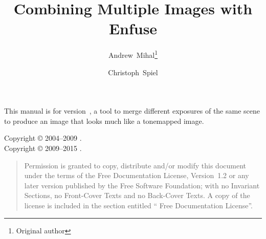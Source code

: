 

\begin{titlepage}
  \renewcommand{\thefootnote}{\fnsymbol{footnote}}

  \author{Andrew~Mihal\footnote{Original author} \and Christoph~Spiel}

  \title{Combining Multiple Images with Enfuse }

  \date{}

  \maketitle
\end{titlepage}


\vspace*{\fill}
\ifhevea\relax\else \begin{center}\end{center}\fi
\label{sec:abstract}\noindent This manual is for \App{}
version~, a tool to merge different exposures of the
same scene to produce an image that looks much like a tonemapped
image.

\vspace*{\fill}

\begin{flushleft}
  Copyright \copyright{} 2004--2009 . \\
  Copyright \copyright{} 2009--2015 .
\end{flushleft}

\begin{quotation}
  \noindent Permission is granted to copy, distribute and/or modify
  this document under the terms of the  Free
  Documentation License, Version~1.2 or any later version published by
  the Free Software Foundation; with no Invariant Sections, no
  Front-Cover Texts and no Back-Cover Texts.  A copy of the license is
  included in the section entitled `` Free Documentation
  License''.
\end{quotation}

\cleardoublepage{}
